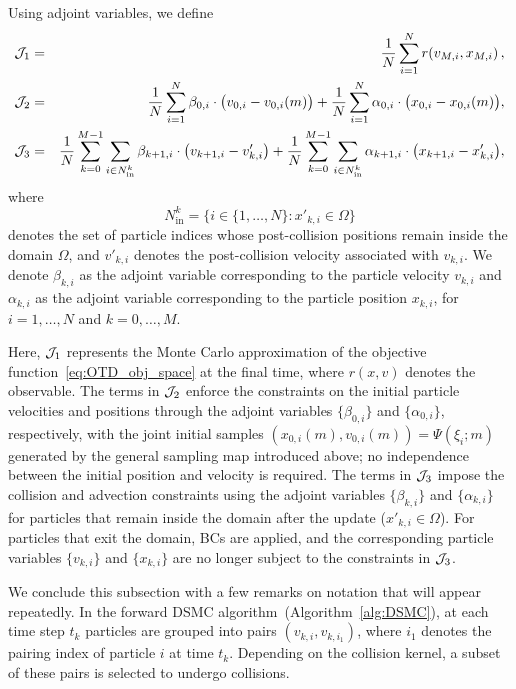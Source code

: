 \documentclass[12pt,nopreprintline]{elsarticle}
\begin{document}
Using adjoint variables, we define
\begin{eqnarray}
\mathcal J_1 &=& \frac{1}{N} \sum_{i=1}^N r\!\left(v_{M,i}, x_{M,i}\right), \label{J1}\\
\mathcal J_2 &=& \frac{1}{N} \sum_{i=1}^{N}  \beta_{0,i} \cdot \bigl(v_{0,i} - v_{0,i}(m)\bigr)
        + \frac{1}{N} \sum_{i=1}^{N} \alpha_{0,i} \cdot \bigl(x_{0,i} - x_{0,i}(m)\bigr), \label{J2}\\
\mathcal J_3 &=& \frac{1}{N} \sum_{k=0}^{M-1}\sum_{i\in N^k_{\mathrm{in}}}
          \beta_{k+1,i} \cdot \bigl(v_{k+1,i}-v_{k,i}'\bigr)
        + \frac{1}{N} \sum_{k=0}^{M-1} \sum_{i\in N^k_{\mathrm{in}}}
          \alpha_{k+1,i} \cdot \bigl(x_{k+1,i}-x'_{k,i}\bigr), \label{J3}
\end{eqnarray}
where
\[
N^k_{\mathrm{in}} = \{ i \in \{1,\ldots,N\} : x'_{k,i} \in \Omega \}
\]
denotes the set of particle indices whose post-collision positions remain inside the domain $\Omega$, and $v'_{k,i}$ denotes the post-collision velocity associated with $v_{k,i}$. We denote $\beta_{k,i}$ as the adjoint variable corresponding to the particle velocity $v_{k,i}$ and $\alpha_{k,i}$ as the adjoint variable corresponding to the particle position $x_{k,i}$, for $i=1,\ldots,N$ and $k=0,\ldots,M$.

Here, $\mathcal J_1$ represents the Monte Carlo approximation of the objective function~\eqref{eq:OTD_obj_space} at the final time, where $r(x,v)$ denotes the observable. The terms in $\mathcal J_2$ enforce the constraints on the initial particle velocities and positions through the adjoint variables $\{\beta_{0,i}\}$ and $\{\alpha_{0,i}\}$, respectively, with the joint initial samples $(x_{0,i}(m),v_{0,i}(m))=\Psi(\xi_i;m)$ generated by the general sampling map introduced above; no independence between the initial position and velocity is required. The terms in $\mathcal J_3$ impose the collision and advection constraints using the adjoint variables $\{\beta_{k,i}\}$ and $\{\alpha_{k,i}\}$ for particles that remain inside the domain after the update ($x'_{k,i} \in \Omega$). For particles that exit the domain, BCs are applied, and the corresponding particle variables $\{v_{k,i}\}$ and $\{x_{k,i}\}$ are no longer subject to the constraints in $\mathcal J_3$.

We conclude this subsection with a few remarks on notation that will appear repeatedly. In the forward DSMC algorithm~(Algorithm~\ref{alg:DSMC}), at each time step $t_k$ particles are grouped into pairs $(v_{k,i}, v_{k,i_1})$, where $i_1$ denotes the pairing index of particle $i$ at time $t_k$. Depending on the collision kernel, a subset of these pairs is selected to undergo collisions.
\end{document}
